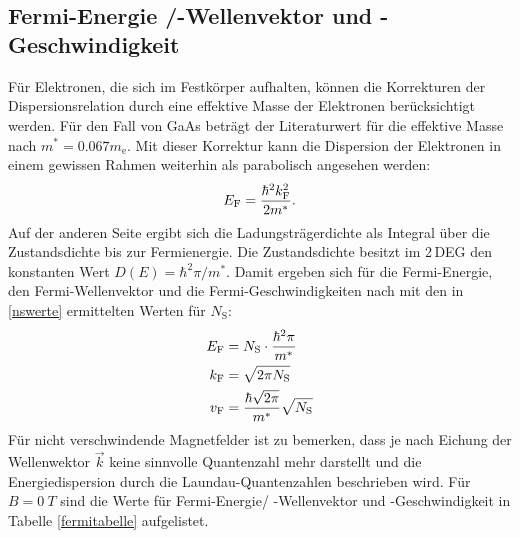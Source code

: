\documentclass[paper=a4,fontsize=10pt,DIV=18,twocolumn,parskip=half]{scrartcl}
\numberwithin{equation}{section}    %
\begin{document}

%
%
~~~~~~~~~~~~~~~~~~~~~~~~~~~~~~~~~~~~~~~~~~~~~~~~~~~~~~~~~~~~~~~~~~~~~~~~~~~~~
\subsection{Fermi-Energie /-Wellenvektor und -Geschwindigkeit}
\label{a5}
Für Elektronen, die sich im Festkörper aufhalten, können die Korrekturen der Dispersionsrelation durch eine effektive Masse der Elektronen berücksichtigt werden. Für den Fall von GaAs beträgt der Literaturwert für die effektive Masse nach \citet{saarland} $m^*=0.067 m_\mathrm{e}$. Mit dieser Korrektur kann die Dispersion der Elektronen in einem gewissen Rahmen weiterhin als parabolisch angesehen werden:
\begin{equation}
E_{\rm F}=\frac{\hbar^2 k_{\rm F}^2}{2 m^*}.
\end{equation}
Auf der anderen Seite ergibt sich die Ladungsträgerdichte als Integral über die Zustandsdichte bis zur Fermienergie. Die Zustandsdichte besitzt im 2\,DEG den konstanten Wert $D(E)=\hbar^2 \pi/m^*$.
Damit ergeben sich für die Fermi-Energie, den Fermi-Wellenvektor und die Fermi-Geschwindigkeiten nach \citet{anleitung} mit den in \ref{nswerte} ermittelten Werten für $N_\mathrm{S}$:
\begin{align}
E_{\rm F}&=N_\mathrm{S} \cdot \frac{\hbar^2 \pi}{m^*}\\
k_{\rm F}&=\sqrt{2 \pi N_\mathrm{S}}\\
v_{\rm F}&=\frac{\hbar\sqrt{2 \pi}}{m^*} \sqrt{N_\mathrm{S}}
\end{align}
Für nicht verschwindende Magnetfelder ist zu bemerken, dass je nach Eichung der Wellenwektor $\vec{k}$ keine sinnvolle Quantenzahl mehr darstellt und die Energiedispersion durch die Laundau-Quantenzahlen beschrieben wird.
Für $B=\SI{0}{T}$ sind die Werte für Fermi-Energie/ -Wellenvektor und -Geschwindigkeit in Tabelle \ref{fermitabelle} aufgelistet.
\end{document}
